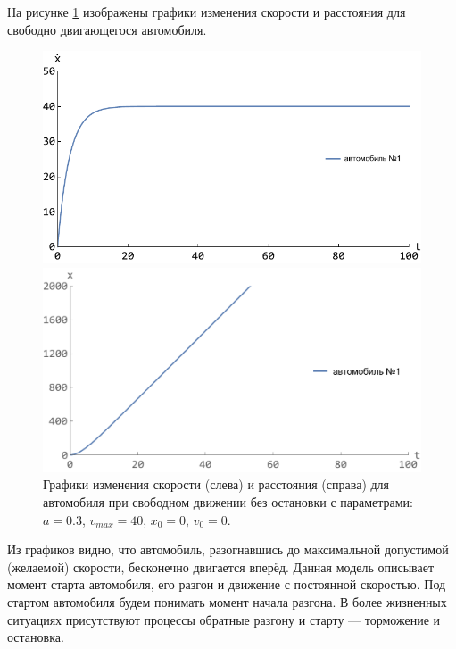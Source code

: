 \documentclass[12pt, a4paper]{extarticle}
\numberwithin{equation}{section}
\numberwithin{figure}{section}
\begin{document}
На рисунке \ref{free_drive_without_stop} изображены графики изменения скорости и расстояния для свободно двигающегося автомобиля.
\begin{figure}[h!]
	\begin{center}
		\begin{minipage}[h!]{0.48\linewidth}
			\includegraphics[width=1\linewidth,height=0.2\textheight]
			{Images/free_drive_speed.pdf}
		\end{minipage}
		\hfill 
		\begin{minipage}[h!]{0.48\linewidth}
			\includegraphics[width=1\linewidth,height=0.2\textheight]
			{Images/free_drive_distance.pdf}
		\end{minipage}
		\caption{Графики изменения скорости (слева) и расстояния (справа) для автомобиля при свободном движении без остановки с параметрами: $a=0.3$, $v_{max}=40$, $x_0=0$, $v_0=0$.}
		\label{free_drive_without_stop}
	\end{center}
\end{figure}

Из графиков видно, что автомобиль, разогнавшись до максимальной допустимой (желаемой) скорости, бесконечно двигается вперёд. Данная модель описывает момент старта автомобиля, его разгон и движение с постоянной скоростью. Под стартом автомобиля будем понимать момент начала разгона. В более жизненных ситуациях присутствуют процессы обратные разгону и старту --- торможение и остановка.
\end{document}
